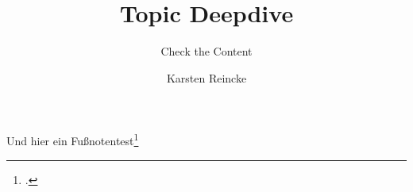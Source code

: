 \documentclass[
  DIV=calc,
  BCOR=5mm,
  11pt,
  headings=small,
  oneside,
  abstract=true,
  toc=bib,
  english,ngerman]{scrartcl}
\def\bibGl{../../../../bib.gl}
\def\cfgGl{../../../../cfg.gl/}
\def\cfgLf{../../../cfg.lf}
\begin{document}

\nocite{*}

\titlehead{Ausbildung zur Fachinformatikerin}
\subject{Release }
\title{Topic Deepdive}

\subtitle{Check the Content}
\author{Karsten Reincke}

\maketitle



Und hier ein Fußnotentest\footcite[vgl.][17]{RlpIt2019a}



\printbibliography


\printnomenclature
\end{document}
